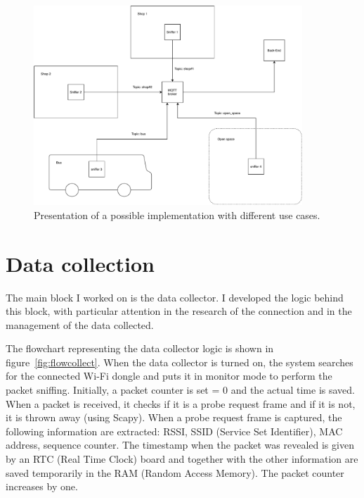 \begin{figure}[h]
\centering 
\includegraphics[width=0.9\textwidth]{images/excases} 
\caption{Presentation of a possible implementation with different use cases.}
\label{fig:excases}
\end{figure}


\section{Data collection}
\label{sec:collection}
\vspace{0.2 cm} 

The main block I worked on is the data collector. I developed the logic behind this block, with particular attention in the research of the connection and in the management of the data collected.

The flowchart representing the data collector logic is shown in figure~\ref{fig:flowcollect}. When the data collector is turned on, the system searches for the connected Wi-Fi dongle and puts it in monitor mode to perform the packet sniffing. Initially, a packet counter is set = 0 and the actual time is saved. When a packet is received, it checks if it is a probe request frame and if it is not, it is thrown away (using Scapy).
When a probe request frame is captured, the following information are extracted: RSSI, SSID (Service Set Identifier), MAC address, sequence counter. The timestamp when the packet was revealed is given by an RTC (Real Time Clock) board and together with the other information are saved temporarily in the RAM (Random Access Memory). The packet counter increases by one.

